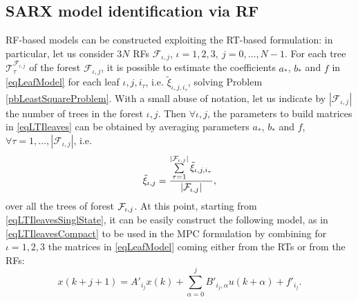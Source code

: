 \subsection{SARX model identification via RF} RF-based models can be constructed exploiting the RT-based formulation: in particular, let us consider $3 N$ RFs $\mathcal{F}_{\iota,j}$, $\iota = 1,2,3,\ j = 0,\ldots,N-1$. 
For each tree $\mathcal{T}^{\mathcal{F}_{\iota,j}}_\tau$ of the forest $\mathcal{F}_{\iota,j}$, it is possible to estimate the coefficients $a_*$, $b_*$ and $f$ in \eqref{eqLeafModel} for each leaf $\iota,j,i_\tau$, i.e. $\tilde\xi_{\iota,j,i_\tau}$, solving Problem \ref{pbLeastSquareProblem}.
With a small abuse of notation, let us indicate by $|\mathcal{F}_{\iota,j}|$ the number of trees in the forest ${\iota,j}$. 
Then $\forall \iota,j$, the parameters to build matrices in \eqref{eqLTIleaves} can be obtained by averaging parameters $a_*$, $b_*$ and $f$, $\forall \tau = 1,\ldots,|\mathcal{F}_{\iota,j}|$, i.e.
\small
\begin{equation}\label{eqAverageRF}
\tilde\xi_{\iota,j} = \frac{\sum\limits_{\tau=1}^{|\mathcal{F}_{\iota,j}|}\tilde\xi_{\iota,j,i_\tau}}{|\mathcal{F}_{\iota,j}|},
\end{equation}
\normalsize
over all the trees of forest $\mathcal{F}_{\iota,j}$. At this point, starting from \eqref{eqLTIleavesSinglState}, it can be easily construct the following model, as in \eqref{eqLTIleavesCompact} to be used in the MPC formulation by combining for $\iota=1,2,3$ the matrices in \eqref{eqLeafModel} coming either from the RTs or from the RFs:
\small
\begin{equation}\label{eqLTIleaves}
	x(k+j+1) = A'_{i_j}x(k) + \sum_{\alpha = 0}^{j}{B'_{i_j,\alpha}u(k+\alpha)} + f'_{i_j}.
\end{equation}
\normalsize



